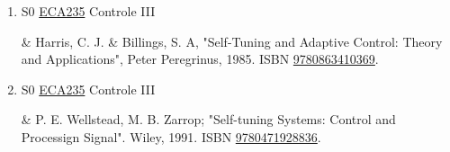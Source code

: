 \documentclass[12pt,a4paper]{book}
\begin{document}
\begin{enumerate}
&   E. F.  Camacho and Bordons, Model Predictive Control, Springer Verlag, 2000.  ISBN \href{http://www.google.com/search?hl=pt-BR&tbo=p&tbm=bks&q=isbn:9781852336943&num=10}{9781852336943}. 

 

 \item S0 \hyperref[PUD:ECA235]{ECA235} Controle III

&   Harris, C. J.  \& Billings, S. A, "Self-Tuning and Adaptive Control: Theory and Applications", Peter Peregrinus, 1985.  ISBN \href{http://www.isbnsearch.org/isbn/9780863410369}{9780863410369}. 

 

 \item S0 \hyperref[PUD:ECA235]{ECA235} Controle III

&   P.  E.  Wellstead, M.  B.  Zarrop;  "Self-tuning Systems: Control and Processign Signal".  Wiley, 1991.  ISBN \href{http://www.isbnsearch.org/isbn/9780471928836}{9780471928836}.\end{enumerate}
\end{document}
